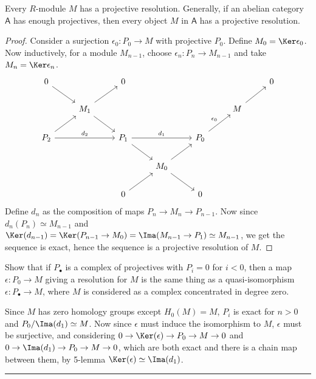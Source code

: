\begin{lemma} Every $R$-module $M$ has a projective resolution. Generally, if an abelian category $\mathsf{A}$ has enough projectives, then every object $M$ in $\mathsf{A}$ has a projective resolution.
\end{lemma}
\begin{proof}
Consider a surjection $\epsilon_0:P_0\rightarrow M$ with projective $P_0$. Define $M_0=\Ker \epsilon_0$. Now inductively, for a module $M_{n-1}$, choose $\epsilon_n:P_n\rightarrow M_{n-1}$ and take $M_n=\Ker \epsilon_n$.
\begin{equation}
\begin{tikzcd}
0\arrow[rd]& &0& & & &0\\
 &M_1\arrow[ru]\arrow[rd]& & & &M\arrow[ru]&\\
P_2\arrow[ru]\arrow{rr}{d_2}& &P_1\arrow[rd]\arrow{rr}{d_1}& &P_0\arrow{ru}{\epsilon_0}& &\\
 & & &M_0 \arrow[ru]\arrow[rd]& & &\\
 & &0\arrow[ru]& & 0& &
\end{tikzcd}
\end{equation}
Define $d_n$ as the composition of maps $P_n\rightarrow M_n\rightarrow P_{n-1}$. Now since $d_n(P_n)\simeq M_{n-1}$ and $\Ker(d_{n-1})=\Ker(P_{n-1}\rightarrow M_0)=\Ima(M_{n-1}\rightarrow P_1)\simeq M_{n-1}$, we get the sequence is exact, hence the sequence is a projective resolution of $M$.
\end{proof}

\begin{exer} Show that if $P_\bullet$ is a complex of projectives with $P_i=0$ for $i<0$, then a map $\epsilon:P_0\rightarrow M$ giving a resolution for $M$ is the same thing as a quasi-isomorphism $\epsilon:P_\bullet\rightarrow M$, where $M$ is considered as a complex concentrated in degree zero.
\end{exer}
\begin{solution}
Since $M$ has zero homology groups except $H_0(M)=M$, $P_i$ is exact for $n>0$ and $P_0/\Ima(d_1)\simeq M$. Now since $\epsilon$ must induce the isomorphism to $M$, $\epsilon$ must be surjective, and considering $0\rightarrow \Ker(\epsilon)\rightarrow P_0\rightarrow M\rightarrow 0$ and $0\rightarrow \Ima(d_1)\rightarrow P_0\rightarrow M\rightarrow 0$, which are both exact and there is a chain map between them, by 5-lemma $\Ker(\epsilon)\simeq \Ima(d_1)$.
\end{solution}
\noindent\rule{\textwidth}{1pt}
\newline